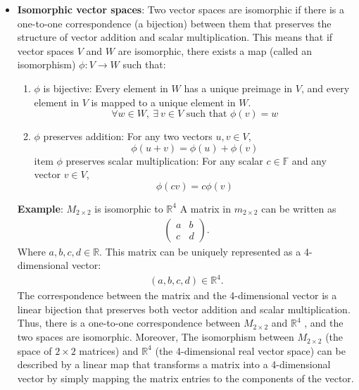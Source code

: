 \documentclass{report}
\begin{document}
\begin{itemize}
            \pagebreak 
        \item \textbf{Isomorphic vector spaces}:
            Two vector spaces are isomorphic if there is a one-to-one correspondence (a bijection) between them that preserves the structure of vector addition and scalar multiplication. This means that if vector spaces $V$ and $W$ are isomorphic, there exists a map (called an isomorphism) $\phi: V \to W$ such that:
            \begin{enumerate}
                \item $\phi$ is bijective: Every element in $W$ has a unique preimage in $V$, and every element in $V$ is mapped to a unique element in $W$.
                \[
                    \forall w \in W, \ \exists\ v \in V \text{ such that } \phi(v) = w
                \]
                \item $\phi$ preserves addition: For any two vectors $u, v \in V$,
                \[
                    \phi(u + v) = \phi(u) + \phi(v)
                \]
                item $\phi$ preserves scalar multiplication: For any scalar $c \in \mathbb{F}$ and any vector $v \in V$,
                \[
                    \phi(cv) = c\phi(v)
                \]
            \end{enumerate}
            \bigbreak \noindent 
            \textbf{Example}: $M_{2\times 2}$ is isomorphic to $\mathbb{R}^{4} $
            \bigbreak \noindent 
            A matrix in $m_{2\times 2}$ can be written as 
            \begin{align*}
                \begin{pmatrix} a & b \\ c & d \end{pmatrix}
            .\end{align*}
            Where $a,b,c,d \in \mathbb{R}$. This matrix can be uniquely represented as a 4-dimensional vector:
            \begin{align*}
                (a,b,c,d) \in \mathbb{R}^{4}
            .\end{align*}
            \bigbreak \noindent 
            The correspondence between the matrix and the 4-dimensional vector is a linear bijection that preserves both vector addition and scalar multiplication. Thus, there is a one-to-one correspondence between $M_{2\times 2}$ and $\mathbb{R}^{4}$ , and the two spaces are isomorphic.
            \bigbreak \noindent 
            Moreover, 
            The isomorphism between $M_{2 \times 2}$ (the space of $2 \times 2$ matrices) and $\mathbb{R}^4$ (the 4-dimensional real vector space) can be described by a linear map that transforms a matrix into a 4-dimensional vector by simply mapping the matrix entries to the components of the vector.

\end{itemize}
\end{document}
